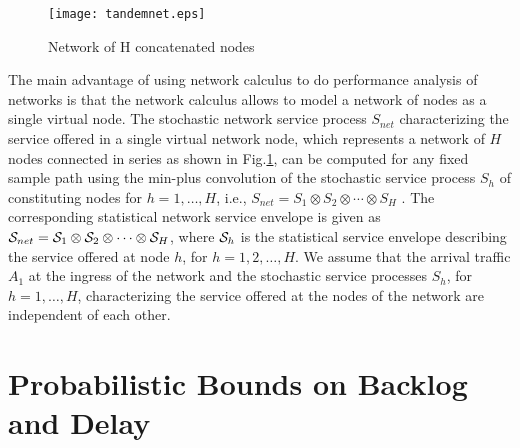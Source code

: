 \documentclass[letterpaper]{IEEEtran}
\begin{document}
\begin{figure}
\centering
\texttt{[image: tandemnet.eps]}
\caption{ Network of H concatenated nodes}
\label{fig:tandemnet} \vspace{-5 mm}
\end{figure}
The main advantage of using network calculus to do performance analysis of networks is that the network calculus allows to model a network of nodes as a single virtual node. The stochastic network service process $S_{net}$ characterizing the service offered in a single virtual network node, which represents a network of $H$ nodes connected in series as shown in Fig.\ref{fig:tandemnet}, can be computed for any fixed sample path using the min-plus convolution of the stochastic service process $S_h$ of constituting nodes for $h=1, \ldots, H$, i.e., $S_{net} = S_1 \otimes S_2 \otimes \cdots \otimes S_H$ \cite{chang:2000,fidler:2006}. The corresponding statistical network service envelope is given as ${\cal S}_{net} = {\cal S}_{1} \otimes {\cal S}_{2} \otimes \cdots \otimes {\cal S}_{H}$, where ${\cal S}_{h}$ is the statistical service envelope describing the service offered at node $h$, for $h = 1, 2, \ldots, H$. We assume that the arrival traffic $A_1$ at the ingress of the network and the stochastic service processes $S_h$, for $h=1, \ldots, H$, characterizing the service offered at the nodes of the network are independent of each other.

\section{Probabilistic Bounds on Backlog and Delay}
\label{sec:bounds}
\end{document}
